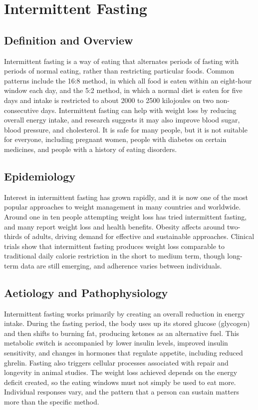 \chapter{Intermittent Fasting}

\section*{Definition and Overview}
Intermittent fasting is a way of eating that alternates periods of fasting with periods of normal eating, rather than restricting particular foods. Common patterns include the 16:8 method, in which all food is eaten within an eight-hour window each day, and the 5:2 method, in which a normal diet is eaten for five days and intake is restricted to about 2000 to 2500 kilojoules on two non-consecutive days. Intermittent fasting can help with weight loss by reducing overall energy intake, and research suggests it may also improve blood sugar, blood pressure, and cholesterol. It is safe for many people, but it is not suitable for everyone, including pregnant women, people with diabetes on certain medicines, and people with a history of eating disorders.

\section*{Epidemiology}
Interest in intermittent fasting has grown rapidly, and it is now one of the most popular approaches to weight management in many countries and worldwide. Around one in ten people attempting weight loss has tried intermittent fasting, and many report weight loss and health benefits. Obesity affects around two-thirds of adults, driving demand for effective and sustainable approaches. Clinical trials show that intermittent fasting produces weight loss comparable to traditional daily calorie restriction in the short to medium term, though long-term data are still emerging, and adherence varies between individuals.

\section*{Aetiology and Pathophysiology}
Intermittent fasting works primarily by creating an overall reduction in energy intake. During the fasting period, the body uses up its stored glucose (glycogen) and then shifts to burning fat, producing ketones as an alternative fuel. This metabolic switch is accompanied by lower insulin levels, improved insulin sensitivity, and changes in hormones that regulate appetite, including reduced ghrelin. Fasting also triggers cellular processes associated with repair and longevity in animal studies. The weight loss achieved depends on the energy deficit created, so the eating windows must not simply be used to eat more. Individual responses vary, and the pattern that a person can sustain matters more than the specific method.

